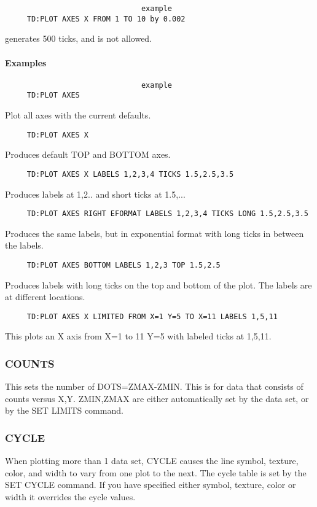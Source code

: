 \begin{verbatim}
                               example
     TD:PLOT AXES X FROM 1 TO 10 by 0.002 
\end{verbatim}
generates 500 ticks, and is not allowed.  
\paragraph{Examples}

\begin{verbatim}
                               example
     TD:PLOT AXES 
\end{verbatim}
Plot all axes with the current defaults.  
\begin{verbatim}
     TD:PLOT AXES X 
\end{verbatim}
Produces default TOP and BOTTOM axes.  
\begin{verbatim}
     TD:PLOT AXES X LABELS 1,2,3,4 TICKS 1.5,2.5,3.5 
\end{verbatim}
Produces labels at 1,2..  and short ticks at 1.5,...  
\begin{verbatim}
     TD:PLOT AXES RIGHT EFORMAT LABELS 1,2,3,4 TICKS LONG 1.5,2.5,3.5 
\end{verbatim}
Produces  the  same labels, but in exponential format with long ticks
in between the labels.  
\begin{verbatim}
     TD:PLOT AXES BOTTOM LABELS 1,2,3 TOP 1.5,2.5 
\end{verbatim}
Produces  labels  with  long ticks on the top and bottom of the plot.
The labels are at different locations.  
\begin{verbatim}
     TD:PLOT AXES X LIMITED FROM X=1 Y=5 TO X=11 LABELS 1,5,11 
\end{verbatim}
This plots an X axis from X=1 to 11 Y=5 with labeled ticks at 1,5,11. 
\subsubsection{COUNTS}
This sets the number of DOTS=ZMAX-ZMIN.  This is for data that consists
of counts versus X,Y.  ZMIN,ZMAX are either automatically  set  by  the
data set, or by the SET LIMITS command.  
\subsubsection{CYCLE}
When  plotting  more  than  1  data  set, CYCLE causes the line symbol,
texture, color, and width to vary from one plot to the next.  The cycle
table  is  set  by the SET CYCLE command.  If you have specified either
symbol, texture, color or width it overrides the cycle values.  

